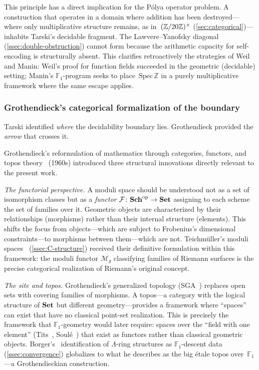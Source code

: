This principle has a direct implication for the P\'olya operator
problem.  A construction that operates in a domain where addition has
been destroyed---where only multiplicative structure remains, as
in~$(\mathbb{Z}/20\mathbb{Z})^\times$ (\cref{sec:categorical})---inhabits Tarski's decidable
fragment.  The Lawvere--Yanofsky diagonal (\cref{ssec:double-obstruction}) cannot form because
the arithmetic capacity for self-encoding is structurally absent.
This clarifies retroactively the strategies of Weil and Manin: Weil's
proof for function fields succeeded in the geometric (decidable)
setting; Manin's $\mathbb{F}_1$-program seeks to
place~$\mathrm{Spec}\,\mathbb{Z}$ in a purely multiplicative
framework where the same escape applies.


\subsubsection{Grothendieck's categorical formalization of the
boundary}\label{sssec:grothendieck}

Tarski identified \emph{where} the decidability boundary lies.
Grothendieck provided the \emph{arrow} that crosses it.

Grothendieck's reformulation of mathematics through categories,
functors, and topos theory~\cite{grothendieck1960elements,grothendieck_sga4} (1960s) introduced three structural
innovations directly relevant to the present work.

\emph{The functorial perspective.}  A moduli space should be
understood not as a set of isomorphism classes but as a \emph{functor}
$\mathcal{F}\colon \mathbf{Sch}^{\mathrm{op}} \to \mathbf{Set}$ assigning to
each scheme the set of families over it.  Geometric objects are
characterized by their relationships (morphisms) rather than their
internal structure (elements).  This shifts the focus from
objects---which are subject to Frobenius's dimensional
constraints---to morphisms between them---which are not.
Teichm\"uller's moduli spaces~\cite{teichmuller39} (\cref{ssec:C-structure}) received
their definitive formulation within this framework: the moduli
functor $\mathcal{M}_g$ classifying families of Riemann surfaces is
the precise categorical realization of Riemann's original concept.

\emph{The site and topos.}  Grothendieck's generalized topology
(SGA~\cite{grothendieck_sga4}) replaces open sets with covering families of morphisms.  A
topos---a category with the logical structure of $\mathbf{Set}$ but different
geometry---provides a framework where ``spaces'' can exist that have no
classical point-set realization.  This is precisely the framework that
$\mathbb{F}_1$-geometry would later require: spaces over the ``field
with one element'' (Tits~\cite{tits56}, Soul\'e~\cite{soule03}) that exist as functors rather than classical
geometric objects.  Borger's~\cite{borger09} identification of $\Lambda$-ring
structures as $\mathbb{F}_1$-descent data (\cref{ssec:convergence})
globalizes to what he describes as the big \'etale topos
over~$\mathbb{F}_1$---a Grothendieckian construction.

